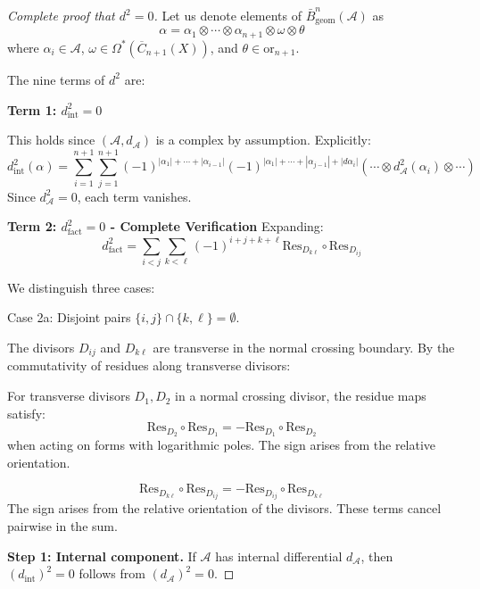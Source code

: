 \begin{proof}[Complete proof that $d^2 = 0$]
Let us denote elements of $\bar{B}^n_{\text{geom}}(\mathcal{A})$ as 
$$\alpha = \alpha_1 \otimes \cdots \otimes \alpha_{n+1} \otimes \omega \otimes \theta$$
where $\alpha_i \in \mathcal{A}$, $\omega \in \Omega^*(\overline{C}_{n+1}(X))$, and $\theta \in \text{or}_{n+1}$.

The nine terms of $d^2$ are:

\textbf{Term 1: $d_{\text{int}}^2 = 0$}

This holds since $(\mathcal{A}, d_{\mathcal{A}})$ is a complex by assumption. Explicitly:
$$d_{\text{int}}^2(\alpha) = \sum_{i=1}^{n+1} \sum_{j=1}^{n+1} (-1)^{|\alpha_1|+\cdots+|\alpha_{i-1}|} (-1)^{|\alpha_1|+\cdots+|\alpha_{j-1}|+|d\alpha_i|} (\cdots \otimes d_{\mathcal{A}}^2(\alpha_i) \otimes \cdots)$$
Since $d_{\mathcal{A}}^2 = 0$, each term vanishes.

\textbf{Term 2: $d_{\text{fact}}^2 = 0$ - Complete Verification}
Expanding:
$$d_{\text{fact}}^2 = \sum_{i<j} \sum_{k<\ell} (-1)^{i+j+k+\ell} \text{Res}_{D_{k\ell}} \circ \text{Res}_{D_{ij}}$$

We distinguish three cases:

Case 2a: Disjoint pairs $\{i,j\} \cap \{k,\ell\} = \emptyset$.

The divisors $D_{ij}$ and $D_{k\ell}$ are transverse in the normal crossing boundary. By the commutativity of residues along transverse divisors:

\begin{lemma}
For transverse divisors $D_1, D_2$ in a normal crossing divisor, the residue maps satisfy:
$$\text{Res}_{D_2} \circ \text{Res}_{D_1} = -\text{Res}_{D_1} \circ \text{Res}_{D_2}$$
when acting on forms with logarithmic poles. The sign arises from the relative orientation.
\end{lemma}
$$\text{Res}_{D_{k\ell}} \circ \text{Res}_{D_{ij}} = -\text{Res}_{D_{ij}} \circ \text{Res}_{D_{k\ell}}$$
The sign arises from the relative orientation of the divisors. These terms cancel pairwise in the sum.

\textbf{Step 1: Internal component.} 
If $\mathcal{A}$ has internal differential $d_\mathcal{A}$, then $(d_{\text{int}})^2 = 0$ follows from $(d_\mathcal{A})^2 = 0$.


\end{proof}
